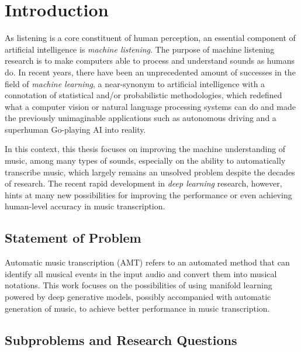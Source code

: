 
\graphicspath{{1/figures/}}

\chapter{Introduction}
\label{ch:introduction}

As listening is a core constituent of human perception, an essential component of artificial intelligence is \emph{machine listening}.
The purpose of machine listening research is to make computers able to process and understand sounds as humans do.
In recent years, there have been an unprecedented amount of successes in the field of \emph{machine learning}, a near-synonym to artificial intelligence with a connotation of statistical and/or probabilistic methodologies, which redefined what a computer vision or natural language processing systems can do and made the previously unimaginable applications such as autonomous driving and a superhuman Go-playing AI into reality.

In this context, this thesis focuses on improving the machine understanding of music, among many types of sounds, especially on the ability to automatically transcribe music, which largely remains an unsolved problem despite the decades of research.
The recent rapid development in \emph{deep learning} research, however, hints at many new possibilities for improving the performance or even achieving human-level accuracy in music transcription.

\section{Statement of Problem}

Automatic music transcription (AMT) refers to an automated method that can identify all musical events in the input audio and convert them into musical notations.
This work focuses on the possibilities of using manifold learning powered by deep generative models, possibly accompanied with automatic generation of music, to achieve better performance in music transcription.


\section{Subproblems and Research Questions}

